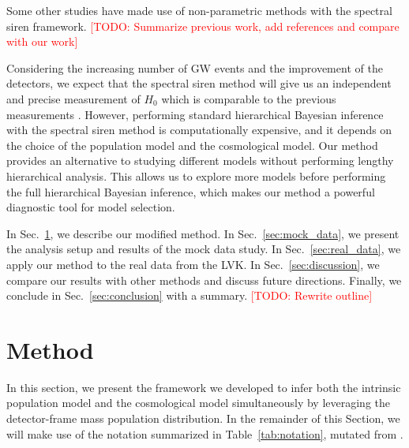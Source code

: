 \documentclass[twocolumn]{aastex631}
\newcommand{\todo}[1]{\textcolor{red}{[TODO: #1]}}
\begin{document}
Some other studies have made use of non-parametric methods with the spectral siren framework.
\todo{Summarize previous work, add references and compare with our work}

Considering the increasing number of \ac{GW} events and the improvement of the detectors, we expect that the spectral siren method will give us an independent and precise measurement of $H_0$ which is comparable to the previous measurements \citep{Planck:2018vyg, Riess:2021jrx}.
However, performing standard hierarchical Bayesian inference with the spectral siren method is computationally expensive, and it depends on the choice of the population model and the cosmological model.
Our method provides an alternative to studying different models without performing lengthy hierarchical analysis.
This allows us to explore more models before performing the full hierarchical Bayesian inference, which makes our method a powerful diagnostic tool for model selection.

In Sec.~\ref{sec:method}, we describe our modified method.
In Sec.~\ref{sec:mock_data}, we present the analysis setup and results of the mock data study.
In Sec.~\ref{sec:real_data}, we apply our method to the real data from the \ac{LVK}.
In Sec.~\ref{sec:discussion}, we compare our results with other methods and discuss future directions.
Finally, we conclude in Sec.~\ref{sec:conclusion} with a summary.
\todo{Rewrite outline}

\section{Method}
\label{sec:method}
In this section, we present the framework we developed to infer both the intrinsic population model and the cosmological model simultaneously by leveraging the detector-frame mass population distribution.
In the remainder of this Section, we will make use of the notation summarized in Table~\ref{tab:notation}, mutated from \citet{Rinaldi:2021bhm, Rinaldi:2022kyg}.
\end{document}
